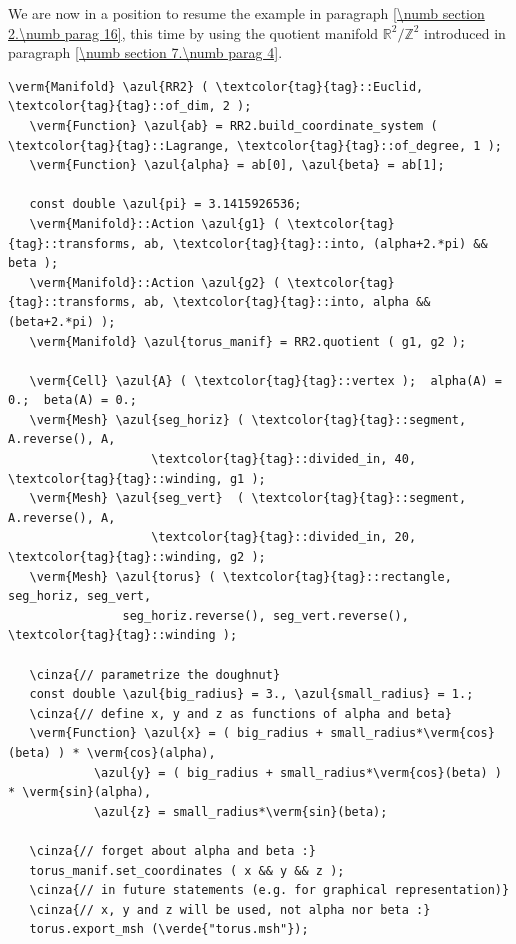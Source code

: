 We are now in a position to resume the example in paragraph \ref{\numb section 2.\numb parag 16},
this time by using the quotient manifold $ \mathbb{R}^2/{\mathbb Z}^2 $ introduced in paragraph
\ref{\numb section 7.\numb parag 4}.

\begin{Verbatim}[commandchars=\\\{\},formatcom=\small\tt,frame=single,
   label=parag-\ref{\numb section 7.\numb parag 5}.cpp,rulecolor=\color{coment},
   baselinestretch=0.94,framesep=2mm                                            ]
   \verm{Manifold} \azul{RR2} ( \textcolor{tag}{tag}::Euclid, \textcolor{tag}{tag}::of_dim, 2 );
   \verm{Function} \azul{ab} = RR2.build_coordinate_system ( \textcolor{tag}{tag}::Lagrange, \textcolor{tag}{tag}::of_degree, 1 );
   \verm{Function} \azul{alpha} = ab[0], \azul{beta} = ab[1];

   const double \azul{pi} = 3.1415926536;
   \verm{Manifold}::Action \azul{g1} ( \textcolor{tag}{tag}::transforms, ab, \textcolor{tag}{tag}::into, (alpha+2.*pi) && beta );
   \verm{Manifold}::Action \azul{g2} ( \textcolor{tag}{tag}::transforms, ab, \textcolor{tag}{tag}::into, alpha && (beta+2.*pi) );
   \verm{Manifold} \azul{torus_manif} = RR2.quotient ( g1, g2 );

   \verm{Cell} \azul{A} ( \textcolor{tag}{tag}::vertex );  alpha(A) = 0.;  beta(A) = 0.;
   \verm{Mesh} \azul{seg_horiz} ( \textcolor{tag}{tag}::segment, A.reverse(), A,
                    \textcolor{tag}{tag}::divided_in, 40, \textcolor{tag}{tag}::winding, g1 );
   \verm{Mesh} \azul{seg_vert}  ( \textcolor{tag}{tag}::segment, A.reverse(), A,
                    \textcolor{tag}{tag}::divided_in, 20, \textcolor{tag}{tag}::winding, g2 );
   \verm{Mesh} \azul{torus} ( \textcolor{tag}{tag}::rectangle, seg_horiz, seg_vert,
                seg_horiz.reverse(), seg_vert.reverse(), \textcolor{tag}{tag}::winding );

   \cinza{// parametrize the doughnut}
   const double \azul{big_radius} = 3., \azul{small_radius} = 1.;
   \cinza{// define x, y and z as functions of alpha and beta}
   \verm{Function} \azul{x} = ( big_radius + small_radius*\verm{cos}(beta) ) * \verm{cos}(alpha),
            \azul{y} = ( big_radius + small_radius*\verm{cos}(beta) ) * \verm{sin}(alpha),
            \azul{z} = small_radius*\verm{sin}(beta);

   \cinza{// forget about alpha and beta :}
   torus_manif.set_coordinates ( x && y && z );
   \cinza{// in future statements (e.g. for graphical representation)}
   \cinza{// x, y and z will be used, not alpha nor beta :}
   torus.export_msh (\verde{"torus.msh"});
\end{Verbatim}


